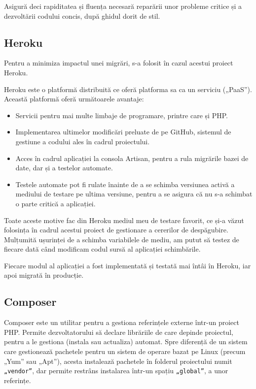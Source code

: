 		Asigură deci rapiditatea și fluența necesară reparării unor probleme critice și a dezvoltării codului concis, după ghidul dorit de stil.

	\subsection{Heroku}

		Pentru a minimiza impactul unei migrări, s-a folosit în cazul acestui proiect Heroku.

		Heroku este o platformă distribuită ce oferă platforma sa ca un serviciu („PaaS”).
		Această platformă oferă următoarele avantaje:

		\begin{itemize}
			\item Servicii pentru mai multe limbaje de programare, printre care și PHP.
			\item Implementarea ultimelor modificări preluate de pe GitHub, sistemul de gestiune a codului ales în cadrul proiectului.
			\item Acces în cadrul aplicației la consola Artisan, pentru a rula migrările bazei de date, dar și a testelor automate.
			\item Testele automate pot fi rulate înainte de a se schimba versiunea activă a mediului de testare pe ultima versiune, pentru a se asigura că nu s-a schimbat o parte critică a aplicației.
		\end{itemize}

		Toate aceste motive fac din Heroku mediul meu de testare favorit, ce și-a văzut folosința în cadrul acestui proiect de gestionare a cererilor de despăgubire.
		Mulțumită ușurinței de a schimba variabilele de mediu, am putut să testez de fiecare dată când modificam codul sursă al aplicației schimbările.

		Fiecare modul al aplicației a fost implementată și testată mai întâi în Heroku, iar apoi migrată în producție.

	\subsection{Composer}

		Composer este un utilitar pentru a gestiona referințele externe într-un proiect PHP.
		Permite dezvoltatorului să declare librăriile de care depinde proiectul, pentru a le gestiona (instala sau actualiza) automat.
		Spre diferență de un sistem care gestionează pachetele pentru un sistem de operare bazat pe Linux (precum „Yum” sau „Apt”), acesta instalează pachetele în folderul proiectului numit \verb|„vendor”|, dar permite restrâns instalarea într-un spațiu \verb|„global”|, a unor referințe. \cite{composer}

